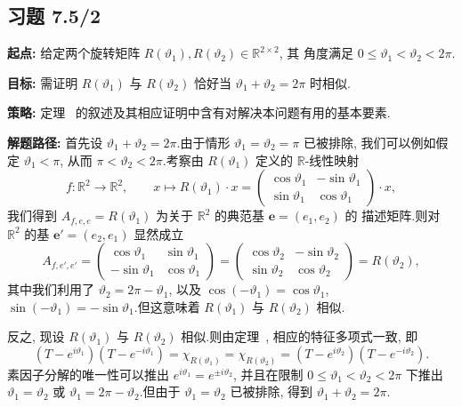 \subsection*{习题 7.5/2}

\noindent\textbf{起点:} 给定两个旋转矩阵 $R(\vartheta_1), R(\vartheta_2) \in \mathbb{R}^{2 \times 2}$, 其
角度满足 $0 \leq \vartheta_1 < \vartheta_2 < 2 \pi$.

\noindent\textbf{目标:} 需证明 $R(\vartheta_1)$ 与 $R(\vartheta_2)$ 恰好当 $\vartheta_1 + \vartheta_2 = 2 \pi$
时相似.

\noindent\textbf{策略:} 定理~ 的叙述及其相应证明中含有对解决本问题有用的基本要素.

\noindent\textbf{解题路径:} 首先设 $\vartheta_1 + \vartheta_2 = 2 \pi$.由于情形 $\vartheta_1 = \vartheta_2 = \pi$
已被排除, 我们可以例如假定 $\vartheta_1 < \pi$, 从而 $\pi < \vartheta_2 < 2 \pi$.考察由 $R(\vartheta_1)$ 定义的
$\mathbb{R}$-线性映射
\[
f \colon \mathbb{R}^2 \longrightarrow \mathbb{R}^2, \qquad x \longmapsto R(\vartheta_1) \cdot x = \begin{pmatrix} \cos \vartheta_1 & -\sin \vartheta_1 \\ \sin \vartheta_1 & \cos \vartheta_1 \end{pmatrix} \cdot x,
\]
我们得到 $A_{f, e, e} = R(\vartheta_1)$ 为关于 $\mathbb{R}^2$ 的典范基 $\boldsymbol{e} = (e_1, e_2)$ 的
描述矩阵.则对 $\mathbb{R}^2$ 的基 $\boldsymbol{e}' = (e_2, e_1)$ 显然成立
\[
A_{f, e', e'} = \begin{pmatrix} \cos \vartheta_1 & \sin \vartheta_1 \\ -\sin \vartheta_1 & \cos \vartheta_1 \end{pmatrix} = \begin{pmatrix} \cos \vartheta_2 & -\sin \vartheta_2 \\ \sin \vartheta_2 & \cos \vartheta_2 \end{pmatrix} = R(\vartheta_2),
\]
其中我们利用了 $\vartheta_2 = 2 \pi - \vartheta_1$, 以及 $\cos(-\vartheta_1) = \cos \vartheta_1$,
$\sin(-\vartheta_1) = -\sin \vartheta_1$.但这意味着 $R(\vartheta_1)$ 与 $R(\vartheta_2)$ 相似.

反之, 现设 $R(\vartheta_1)$ 与 $R(\vartheta_2)$ 相似.则由定理~, 相应的特征多项式一致, 即
\[
(T - e^{i \vartheta_1})(T - e^{-i \vartheta_1}) = \chi_{R(\vartheta_1)} = \chi_{R(\vartheta_2)} = (T - e^{i \vartheta_2})(T - e^{-i \vartheta_2})\text{.}
\]
素因子分解的唯一性可以推出 $e^{i \vartheta_1} = e^{\pm i \vartheta_2}$, 并且在限制
$0 \leq \vartheta_1 < \vartheta_2 < 2 \pi$ 下推出 $\vartheta_1 = \vartheta_2$ 或
$\vartheta_1 = 2 \pi - \vartheta_2$.但由于 $\vartheta_1 = \vartheta_2$ 已被排除, 得到
$\vartheta_1 + \vartheta_2 = 2 \pi$.

